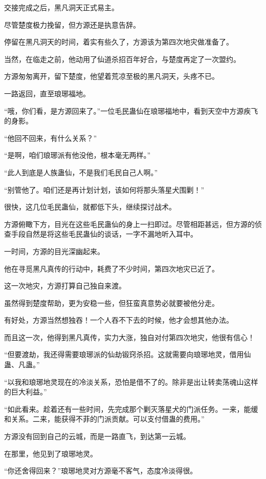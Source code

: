
\begin{this_body}

交接完成之后，黑凡洞天正式易主。

尽管楚度极力挽留，但方源还是执意告辞。

停留在黑凡洞天的时间，着实有些久了，方源该为第四次地灾做准备了。

当然，在临走之前，他动用了仙道杀招百年好合，与楚度再定了一次盟约。

方源匆匆离开，留下楚度，他望着荒凉至极的黑凡洞天，头疼不已。

一路返回，直至琅琊福地。

“哦，你们看，是方源回来了。”一位毛民蛊仙在琅琊福地中，看到天空中方源疾飞的身影。

“他回不回来，有什么关系？”

“是啊，咱们琅琊派有他没他，根本毫无两样。”

“此人到底是人族蛊仙，不是我们毛民自己人啊。”

“别管他了。咱们还是再计划计划，该如何将那头落星犬围剿！”

很快，这几位毛民蛊仙，就都低下头，继续探讨战术。

方源俯瞰下方，目光在这些毛民蛊仙的身上一扫即过。尽管相距甚远，但方源的侦查手段自然是将这些毛民蛊仙的谈话，一字不漏地听入耳中。

一时间，方源的目光深幽起来。

他在寻觅黑凡真传的行动中，耗费了不少时间，第四次地灾已近了。

这一次地灾，方源打算自己独自来渡。

虽然得到楚度帮助，更为安稳一些，但狂蛮真意势必就要被他分走。

有好处，方源当然想独吞！一个人吞不下去的时候，他才会想其他办法。

而且这一次，他得到黑凡真传，实力大涨，独自对付第四次地灾，他很有信心！

“但要渡劫，我还得需要琅琊派的仙劫锻窍杀招。这就需要向琅琊地灵，借用仙蛊、凡蛊。”

“以我和琅琊地灵现在的冷淡关系，恐怕是借不了的。除非是出让转卖荡魂山这样的巨大利益。”

“如此看来。趁着还有一些时间，先完成那个剿灭落星犬的门派任务。一来，能缓和关系。二来，能获得不菲的门派贡献。可以支付借蛊的费用。”

方源没有回到自己的云城，而是一路直飞，到达第一云城。

在那里，他见到了琅琊地灵。

“你还舍得回来？”琅琊地灵对方源毫不客气，态度冷淡得很。


\end{this_body}
